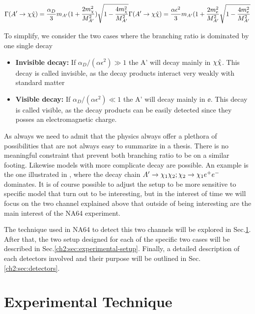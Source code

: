 \begin{equation}
  \label{ch1:eq:dm-bratio}
  \Gamma(A'\rightarrow\chi \hat{\chi}) = \frac{\alpha_D}{3}m_{A'}(1 + \frac{2m^2_{\chi}}{M^2_{A'}})\sqrt{1 - \frac{4m^2_{\chi}}{M^2_{A'}}}   
  \Gamma(A'\rightarrow\chi \hat{\chi}) = \frac{\alpha \epsilon^2}{3}m_{A'}(1 + \frac{2m^2_{e}}{M^2_{A'}}\sqrt{1 - \frac{4m^2_{e}}{M^2_{A'}}} 
\end{equation}

To simplify, we consider the two cases where the branching ratio is dominated by one single decay

\begin{itemize}
\item \textbf{Invisible decay:} If $\alpha_D / (\alpha \epsilon^2) \gg 1$ the A' will decay mainly in $\chi \hat{\chi}$. This decay is called invisible, as the decay products interact very weakly with standard matter
\item \textbf{Visible decay:} If $\alpha_D / (\alpha \epsilon^2) \ll 1$ the A' will decay mainly in $\ee$. This decay is called visible, as the decay products can be easily detected since they posses an electromagnetic charge. 
\end{itemize}

As always we need to admit that the physics always offer a plethora of possibilities that are not always easy to summarize in a thesis. There is no meaningful constraint that prevent both branching ratio to be on a similar footing. Likewise models with more complicate decay are possible. An example is the one illustrated in \cite{Mohlabeng_2019}, where the decay chain $A' \to \chi_1 \chi_2; \chi_2 \to \chi_1 e^+e^-$ dominates. It is of course possible to adjust the setup to be more sensitive to specific model that turn out to be interesting, but in the interest of time we will focus on the two channel explained above that outside of being interesting are the main interest of the NA64 experiment.

The technique used in NA64 to detect this two channels will be explored in Sec.\ref{ch2:sec:experimental-technique}. After that, the two setup designed for each of the specific two cases will be described in Sec.\ref{ch2:sec:experimental-setup}. Finally, a detailed description of each detectors involved and their purpose will be outlined in Sec.\ref{ch2:sec:detectors}.


\section{Experimental Technique}
\label{ch2:sec:experimental-technique}

